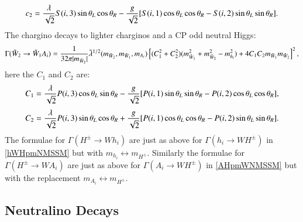 \documentclass[final,3p,times]{elsarticle}
\begin{document}
\begin{equation}
c_{2} = {\lambda \over \sqrt{2}}S(i,3)\sin\theta_L \cos\theta_R - {g \over \sqrt{2}}[S(i,1)\cos\theta_L \cos\theta_R - S(i,2) \sin\theta_L \sin\theta_R].
\end{equation}
The chargino decays to lighter charginos and a CP odd neutral Higgs:
\begin{equation} \label{ch2ch1ANMSSM}
\Gamma(\tilde{W}_2 \rightarrow \tilde{W}_1 A_{i}) = {1 \over 32 \pi |m_{\tilde{W}_2}|} \tilde{\lambda}^{1/2}(m_{\tilde{W}_2},m_{\tilde{W}_1},m_{A_i})\left[(C_{1}^2 + C_{2}^2)(m_{\tilde{W}_1}^2 + m_{\tilde{W}_2}^2 - m_{h_i}^2) + 4C_{1} C_{2} m_{\tilde{W}_1} m_{\tilde{W}_2}\right]^2,
\end{equation}
here the $C_{1}$ and $C_{2}$ are:
\begin{equation}
C_{1} = {\lambda \over \sqrt{2}}P(i,3)\cos\theta_L \sin\theta_R - {g \over \sqrt{2}}[P(i,1)\sin\theta_L \sin\theta_R - P(i,2) \cos\theta_L \cos\theta_R],
\end{equation}
\begin{equation}
C_{2} = {\lambda \over \sqrt{2}}P(i,3)\sin\theta_L \cos\theta_R + {g \over \sqrt{2}}[P(i,1)\cos\theta_L \cos\theta_R -P(i,2) \sin\theta_L \sin\theta_R].
\end{equation}
The formulae for $\Gamma(H^{\pm} \rightarrow W h_{i})$ are just as above for $\Gamma(h_i \rightarrow W H^{\pm})$ in  \eqref{hWHpmNMSSM} but with $m_{h_i} \leftrightarrow m_{H^{\pm}}$. Similarly the  formulae for $\Gamma(H^{\pm} \rightarrow W A_{i})$ are just as above for $\Gamma(A_i \rightarrow W H^{\pm})$ in \eqref{AHpmWNMSSM} but with the replacement $m_{A_i} \leftrightarrow m_{H^{\pm}}$.

\subsection{Neutralino Decays}
\end{document}
